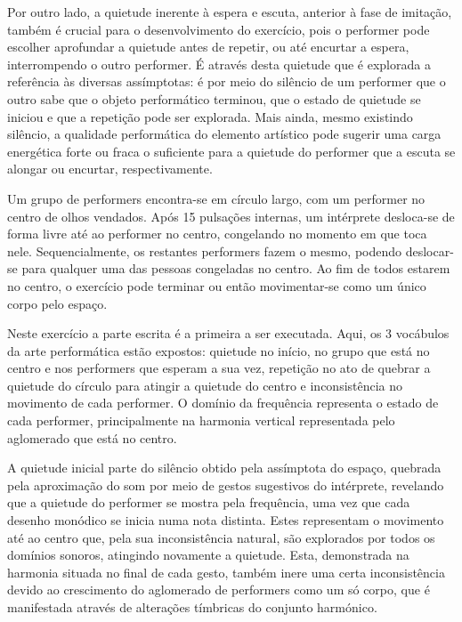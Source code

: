 \documentclass[../main.tex]{subfiles}
\begin{document}
Por outro lado, a quietude inerente à espera e escuta, anterior à fase de imitação, também é crucial para o desenvolvimento do exercício, pois o performer pode escolher aprofundar a quietude antes de repetir, ou até encurtar a espera, interrompendo o outro performer. É através desta quietude que é explorada a referência às diversas assímptotas: é por meio do silêncio de um performer que o outro sabe que o objeto performático terminou, que o estado de quietude se iniciou e que a repetição pode ser explorada. Mais ainda, mesmo existindo silêncio, a qualidade performática do elemento artístico pode sugerir uma carga energética forte ou fraca o suficiente para a quietude do performer que a escuta se alongar ou encurtar, respectivamente.

\begin{performex}
    Um grupo de performers encontra-se em círculo largo, com um performer no centro de olhos vendados. Após 15 pulsações internas, um intérprete desloca-se de forma livre até ao performer no centro, congelando no momento em que toca nele. Sequencialmente, os restantes performers fazem o mesmo, podendo deslocar-se para qualquer uma das pessoas congeladas no centro. Ao fim de todos estarem no centro, o exercício pode terminar ou então movimentar-se como um único corpo pelo espaço.
\end{performex}

Neste exercício a parte escrita é a primeira a ser executada. Aqui, os 3 vocábulos da arte performática estão expostos: quietude no início, no grupo que está no centro e nos performers que esperam a sua vez, repetição no ato de quebrar a quietude do círculo para atingir a quietude do centro e inconsistência no movimento de cada performer. O domínio da frequência representa o estado de cada performer, principalmente na harmonia vertical representada pelo aglomerado que está no centro. 

A quietude inicial parte do silêncio obtido pela assímptota do espaço, quebrada pela aproximação do som por meio de gestos sugestivos do intérprete, revelando que a quietude do performer se mostra pela frequência, uma vez que cada desenho monódico se inicia numa nota distinta. Estes representam o movimento até ao centro que, pela sua inconsistência natural, são explorados por todos os domínios sonoros, atingindo novamente a quietude. Esta, demonstrada na harmonia situada no final de cada gesto, também inere uma certa inconsistência devido ao crescimento do aglomerado de performers como um só corpo, que é manifestada através de alterações tímbricas do conjunto harmónico.
\end{document}
